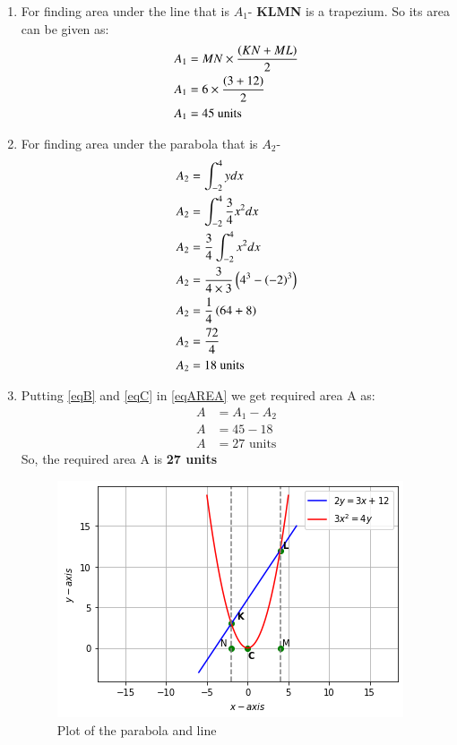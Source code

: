 \documentclass[journal,12pt,twocolumn]{IEEEtran}
\begin{document}
\begin{enumerate}
\item For finding area under the line that is $A_1$-
\textbf{KLMN} is a trapezium. So its area can be given as:
\begin{align}
  A_1 &= MN\times\frac{\left(KN+ML\right)}{2} 
  \\
   A_1 &= 6\times\frac{\left(3+12\right)}{2} 
   \\
    A_1 &=45 \text{ units} \label{eqB}
\end{align}
\item For finding area under the parabola that is $A_2$-
\begin{align}
    A_2&= \int_{-2}^{4} y dx
    \\
    A_2&= \int_{-2}^{4} \frac{3}{4} x^2 dx
    \\
    A_2&= \frac{3}{4} \int_{-2}^{4}  x^2 dx
    \\
    A_2&= \frac{3}{4\times3} \left(4^3-\left(-2\right)^3\right)
    \\
    A_2&= \frac{1}{4} \left(64 +8\right)
    \\
    A_2&= \frac{72}{4} 
    \\
    A_2&= 18 \text{ units} \label{eqC}
\end{align}
\item Putting \eqref{eqB} and \eqref{eqC} in \eqref{eqAREA} we get required area A as:
\begin{align}
 A &= A_1 -A_2 
 \\
 A &= 45-18
 \\
 A &= 27 \text{ units}
\end{align}
So, the required area A is \textbf{27 units}
\begin{figure}[ht]
\centering
\includegraphics[width=\columnwidth]{parabola&line.png}
\caption{Plot of the parabola and line}
\label{Plot of the Parabola and line}
\end{figure}
\end{enumerate}
\end{document}
